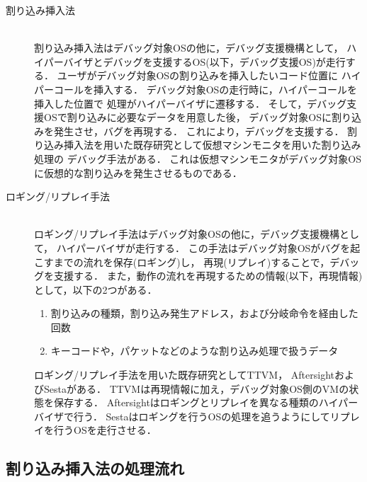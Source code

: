\documentclass[submit,techreq,noauthor,dvipdfmx]{ipsj}
\begin{document}
\begin{description}
    \item[割り込み挿入法]\mbox{}\\
        割り込み挿入法はデバッグ対象OSの他に，デバッグ支援機構として，
        ハイパーバイザとデバッグを支援するOS(以下，デバッグ支援OS)が走行する．
        ユーザがデバッグ対象OSの割り込みを挿入したいコード位置に
        ハイパーコールを挿入する．
        デバッグ対象OSの走行時に，ハイパーコールを挿入した位置で
        処理がハイパーバイザに遷移する．
        そして，デバッグ支援OSで割り込みに必要なデータを用意した後，
        デバッグ対象OSに割り込みを発生させ，バグを再現する．
        これにより，デバッグを支援する．
        割り込み挿入法を用いた既存研究として仮想マシンモニタを用いた割り込み処理の
        デバッグ手法\cite{miyahara}がある．
        これは仮想マシンモニタがデバッグ対象OSに仮想的な割り込みを発生させるものである．
    \item[ロギング/リプレイ手法]\mbox{}\\
        ロギング/リプレイ手法はデバッグ対象OSの他に，デバッグ支援機構として，
        ハイパーバイザが走行する．
        この手法はデバッグ対象OSがバグを起こすまでの流れを保存(ロギング)し，
        再現(リプレイ)することで，デバッグを支援する．
        また，動作の流れを再現するための情報(以下，再現情報)として，以下の2つがある．
        \begin{enumerate}
            \item 割り込みの種類，割り込み発生アドレス，および分岐命令を経由した回数
            \item キーコードや，パケットなどのような割り込み処理で扱うデータ
        \end{enumerate}
        ロギング/リプレイ手法を用いた既存研究としてTTVM\cite{samuel}，
        Aftersight\cite{jim}およびSesta\cite{kawasaki}がある．
        TTVMは再現情報に加え，デバッグ対象OS側のVMの状態を保存する．
        Aftersightはロギングとリプレイを異なる種類のハイパーバイザで行う．
        Sestaはロギングを行うOSの処理を追うようにしてリプレイを行うOSを走行させる．
\end{description}


\subsection{割り込み挿入法の処理流れ}\label{sec:processing_flow_interrupt_inserting_method}

\end{document}
